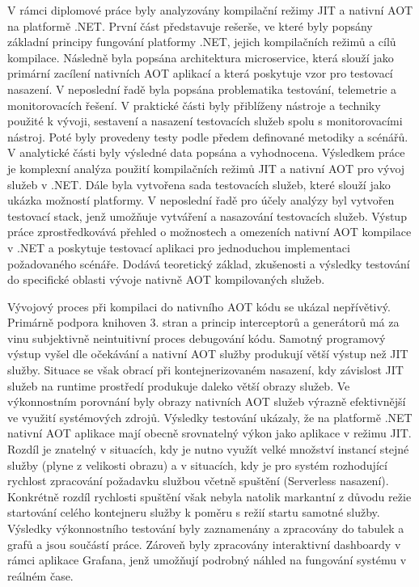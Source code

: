 
V rámci diplomové práce byly analyzovány kompilační režimy JIT a nativní AOT na platformě .NET. První část představuje rešerše, ve které byly popsány základní principy fungování platformy .NET, jejich kompilačních režimů a cílů kompilace. Následně byla popsána architektura microservice, která slouží jako primární zacílení nativních AOT aplikací a která poskytuje vzor pro testovací nasazení. V neposlední řadě byla popsána problematika testování, telemetrie a monitorovacích řešení. V praktické části byly přiblíženy nástroje a techniky použité k vývoji, sestavení a nasazení testovacích služeb spolu s monitorovacími nástroj. Poté byly provedeny testy podle předem definované metodiky a scénářů. V analytické části byly výsledné data popsána a vyhodnocena. Výsledkem práce je komplexní analýza použití kompilačních režimů JIT a nativní AOT pro vývoj služeb v .NET. Dále byla vytvořena sada testovacích služeb, které slouží jako ukázka možností platformy. V neposlední řadě pro účely analýzy byl vytvořen testovací stack, jenž umožňuje vytváření a nasazování testovacích služeb. Výstup práce zprostředkovává přehled o možnostech a omezeních nativní AOT kompilace v .NET a poskytuje testovací aplikaci pro jednoduchou implementaci požadovaného scénáře. Dodává teoretický základ, zkušenosti a výsledky testování do specifické oblasti vývoje nativně AOT kompilovaných služeb.

Vývojový proces při kompilaci do nativního AOT kódu se ukázal nepřívětivý. Primárně podpora knihoven 3. stran a princip interceptorů a generátorů má za vinu subjektivně neintuitivní proces debugování kódu. Samotný programový výstup vyšel dle očekávání a nativní AOT služby produkují větší výstup než JIT služby. Situace se však obrací při kontejnerizovaném nasazení, kdy závislost JIT služeb na runtime prostředí produkuje daleko větší obrazy služeb. Ve výkonnostním porovnání byly obrazy nativních AOT služeb výrazně efektivnější ve využití systémových zdrojů. Výsledky testování ukázaly, že na platformě .NET nativní AOT aplikace mají obecně srovnatelný výkon jako aplikace v režimu JIT. Rozdíl je znatelný v situacích, kdy je nutno využít velké množství instancí stejné služby (plyne z velikosti obrazu) a v situacích, kdy je pro systém rozhodující rychlost zpracování požadavku službou včetně spuštění (Serverless nasazení). Konkrétně rozdíl rychlosti spuštění však nebyla natolik markantní z důvodu režie startování celého kontejneru služby k poměru s režií startu samotné služby. Výsledky výkonnostního testování byly zaznamenány a zpracovány do tabulek a grafů a jsou součástí práce. Zároveň byly zpracovány interaktivní dashboardy v rámci aplikace Grafana, jenž umožňují podrobný náhled na fungování systému v reálném čase. 

